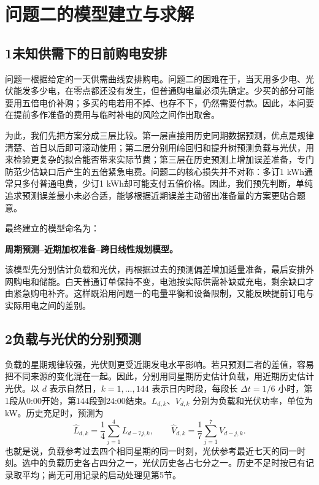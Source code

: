 \documentclass[11pt,a4paper]{article}
\begin{document}
\section*{问题二的模型建立与求解}
\subsection*{1\quad 未知供需下的日前购电安排}

问题一根据给定的一天供需曲线安排购电。问题二的困难在于，当天用多少电、光伏能发多少电，在零点都还没有发生，但普通购电量必须先确定。少买的部分可能要用五倍电价补购；多买的电若用不掉、也存不下，仍然需要付款。因此，本问要在提前多作准备的费用与临时补电的风险之间作出取舍。

为此，我们先把方案分成三层比较。第一层直接用历史同期数据预测，优点是规律清楚、首日以后即可滚动使用；第二层分别用岭回归和提升树预测负载与光伏，用来检验更复杂的拟合能否带来实际节费；第三层在历史预测上增加误差准备，专门防范少估缺口后产生的五倍紧急电费。问题二的核心损失并不对称：多订1 kWh通常只多付普通电费，少订1 kWh却可能支付五倍价格。因此，我们预先判断，单纯追求预测误差最小未必合适，能够根据近期误差主动留出准备量的方案更贴合题意。

最终建立的模型命名为：

\textbf{周期预测--近期加权准备--跨日线性规划模型。}

该模型先分别估计负载和光伏，再根据过去的预测偏差增加适量准备，最后安排外网购电和储能。白天普通订单保持不变，电池按实际供需补缺或充电，剩余缺口才由紧急购电补齐。这样既沿用问题一的电量平衡和设备限制，又能反映提前订电与实际用电之间的差别。

\subsection*{2\quad 负载与光伏的分别预测}

负载的星期规律较强，光伏则更受近期发电水平影响。若只预测二者的差值，容易把不同来源的变化混在一起。因此，分别用同星期历史估计负载，用近期历史估计光伏。以 $d$ 表示自然日，$k=1,\ldots,144$ 表示日内时段，每段长 $\Delta t=1/6$ 小时，第1段从0:00开始，第144段到24:00结束。$L_{d,k}$、$V_{d,k}$ 分别为负载和光伏功率，单位为 kW。历史充足时，预测为
\begin{equation}
\widehat L_{d,k}=\frac14\sum_{j=1}^{4}L_{d-7j,k},\qquad
\widehat V_{d,k}=\frac17\sum_{j=1}^{7}V_{d-j,k}.
\label{eq:forecast}
\end{equation}
也就是说，负载参考过去四个相同星期的同一时刻，光伏参考最近七天的同一时刻。选中的负载历史各占四分之一，光伏历史各占七分之一。历史不足时按已有记录取平均；尚无可用记录的启动处理见第5节。
\end{document}
